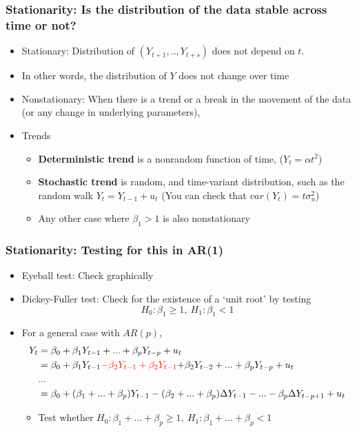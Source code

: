 \documentclass[aspectratio=169]{beamer}
\begin{document}
\begin{frame}
\frametitle{Stationarity: Is the distribution of the data stable across time or not?}
\begin{itemize}
\item Stationary: Distribution of $(Y_{t+1},..,Y_{t+s})$ does not depend on $t$. 
\item In other words, the distribution of $Y$ does not change over time
\item Nonstationary:  When there is a trend or a break in the movement of the data (or any change in underlying parameters), 
\item Trends
\begin{itemize}
\item \textbf{Deterministic trend} is a nonrandom  function of time, ($Y_t = \alpha t^2$)
\item \textbf{Stochastic trend} is random, and time-variant distribution, such as the random walk $Y_t = Y_{t-1}+u_t$  (You can check that $var(Y_t)=t\sigma_u^2$)
\item Any other case where $\beta_1>1$ is also nonstationary
\end{itemize} 
\end{itemize}
\end{frame}

\begin{frame}
\frametitle{Stationarity: Testing for this in AR(1)}
\begin{itemize}
\item Eyeball test: Check graphically
\item Dickey-Fuller test: Check for the existence of a `unit root' by testing
\[
H_0: \beta_1\geq 1,\ H_1 : \beta_1<1 
\]
\item For a general case with $AR(p)$, 
\[
\begin{aligned}
 Y_t&=\beta_0 + \beta_1 Y_{t-1}+ ...+\beta_pY_{t-p}+u_t\\
  &=\beta_0 + \beta_1Y_{t-1}\color{red}{-\beta_2 Y_{t-1}+\beta_2Y_{t-1}}\color{black}{+\beta_2 Y_{t-2}+...+\beta_pY_{t-p}+u_t}\\
  & ...\\
 &=\beta_0 + (\beta_1+...+\beta_p)Y_{t-1}-(\beta_2+...+\beta_p)\Delta Y_{t-1} - ... - \beta_{p}\Delta Y_{t-p+1}+u_t \\
 \end{aligned}
\]
\begin{itemize}
\item Test whether $H_0: \beta_1+...+\beta_p\geq 1,\ H_1 : \beta_1+...+\beta_p<1 $
\end{itemize}
\end{itemize}
\end{frame}
\end{document}
